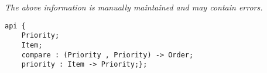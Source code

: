 \label{api:Priority}

{\tiny \it The above information is manually maintained and may contain errors.}
\begin{verbatim}
api {
    Priority;
    Item;
    compare : (Priority , Priority) -> Order;
    priority : Item -> Priority;};
\end{verbatim}
